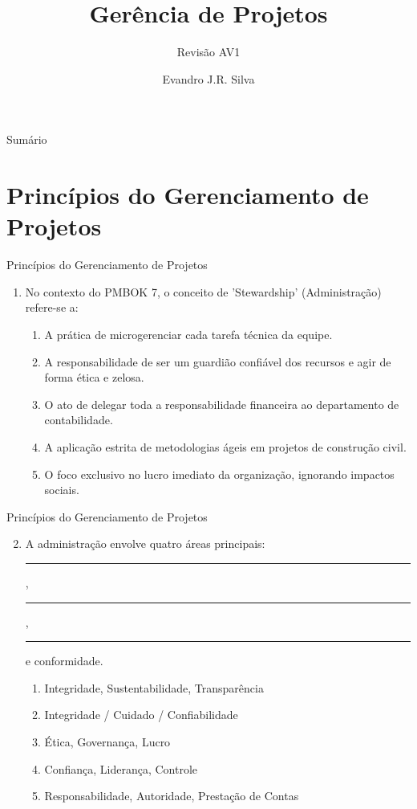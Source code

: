 \documentclass{beamer}
\title[GP 05]{Gerência de Projetos}
\subtitle{Revisão AV1}
\author[E.J.R. Silva]{Evandro J.R. Silva}
\date{}
\begin{document}
	
	\begin{frame}
		\titlepage
	\end{frame}
	
	\begin{frame}{Sumário}
		\tableofcontents
	\end{frame}

\section{Princípios do Gerenciamento de Projetos}

\begin{frame}{Princípios do Gerenciamento de Projetos}
	\begin{enumerate}
		\justifying
		\item No contexto do PMBOK 7, o conceito de 'Stewardship' (Administração) refere-se a:
		\begin{enumerate}[a]
			\item A prática de microgerenciar cada tarefa técnica da equipe.
			\item \alert<2>{A responsabilidade de ser um guardião confiável dos recursos e agir de forma ética e zelosa.}
			\item O ato de delegar toda a responsabilidade financeira ao departamento de contabilidade.
			\item A aplicação estrita de metodologias ágeis em projetos de construção civil.
			\item O foco exclusivo no lucro imediato da organização, ignorando impactos sociais.
		\end{enumerate}
	\end{enumerate}
\end{frame}

\begin{frame}{Princípios do Gerenciamento de Projetos}
	\begin{enumerate}
		\setcounter{enumi}{1}
		\justifying
		\item A administração envolve quatro áreas principais: \rule{60pt}{1pt}, \rule{60pt}{1pt}, \rule{60pt}{1pt} e conformidade.
		\begin{enumerate}[a]
			\item Integridade, Sustentabilidade, Transparência
			\item \alert<2>{Integridade / Cuidado / Confiabilidade}
			\item Ética, Governança, Lucro
			\item Confiança, Liderança, Controle
			\item Responsabilidade, Autoridade, Prestação de Contas
		\end{enumerate}
	\end{enumerate}
\end{frame}
\end{document}
